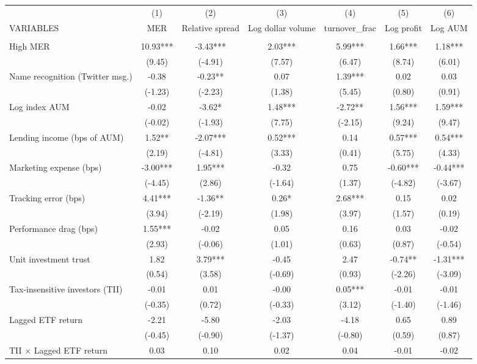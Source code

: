 \documentclass[]{article}
\begin{document}
\begin{tabular}{lcccccc} \hline
 & (1) & (2) & (3) & (4) & (5) & (6) \\
VARIABLES & MER & Relative spread & Log dollar volume & turnover\_frac & Log profit & Log AUM \\ \hline
 &  &  &  &  &  &  \\
High MER & 10.93*** & -3.43*** & 2.03*** & 5.99*** & 1.66*** & 1.18*** \\
 & (9.45) & (-4.91) & (7.57) & (6.47) & (8.74) & (6.01) \\
Name recognition (Twitter msg.) & -0.38 & -0.23** & 0.07 & 1.39*** & 0.02 & 0.03 \\
 & (-1.23) & (-2.23) & (1.38) & (5.45) & (0.80) & (0.91) \\
Log index AUM & -0.02 & -3.62* & 1.48*** & -2.72** & 1.56*** & 1.59*** \\
 & (-0.02) & (-1.93) & (7.75) & (-2.15) & (9.24) & (9.47) \\
Lending income (bps of AUM) & 1.52** & -2.07*** & 0.52*** & 0.14 & 0.57*** & 0.54*** \\
 & (2.19) & (-4.81) & (3.33) & (0.41) & (5.75) & (4.33) \\
Marketing expense (bps) & -3.00*** & 1.95*** & -0.32 & 0.75 & -0.60*** & -0.44*** \\
 & (-4.45) & (2.86) & (-1.64) & (1.37) & (-4.82) & (-3.67) \\
Tracking error (bps) & 4.41*** & -1.36** & 0.26* & 2.68*** & 0.15 & 0.02 \\
 & (3.94) & (-2.19) & (1.98) & (3.97) & (1.57) & (0.19) \\
Performance drag (bps) & 1.55*** & -0.02 & 0.05 & 0.16 & 0.03 & -0.02 \\
 & (2.93) & (-0.06) & (1.01) & (0.63) & (0.87) & (-0.54) \\
Unit investment trust & 1.82 & 3.79*** & -0.45 & 2.47 & -0.74** & -1.31*** \\
 & (0.54) & (3.58) & (-0.69) & (0.93) & (-2.26) & (-3.09) \\
Tax-insensitive investors (TII) & -0.01 & 0.01 & -0.00 & 0.05*** & -0.01 & -0.01 \\
 & (-0.35) & (0.72) & (-0.33) & (3.12) & (-1.40) & (-1.46) \\
Lagged ETF return & -2.21 & -5.80 & -2.03 & -4.18 & 0.65 & 0.89 \\
 & (-0.45) & (-0.90) & (-1.37) & (-0.80) & (0.59) & (0.87) \\
TII $\times$ Lagged ETF return & 0.03 & 0.10 & 0.02 & 0.04 & -0.01 & -0.02 \\

\end{tabular}
\end{document}
